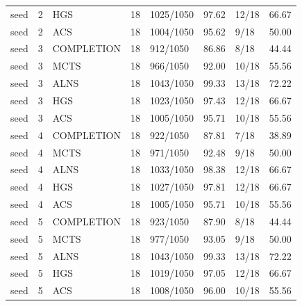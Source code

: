 \begin{tabular}{llllllll}
seed & 2 & HGS & 18 & 1025/1050 & 97.62 & 12/18 & 66.67 \\
seed & 2 & ACS & 18 & 1004/1050 & 95.62 & 9/18 & 50.00 \\
seed & 3 & COMPLETION & 18 & 912/1050 & 86.86 & 8/18 & 44.44 \\
seed & 3 & MCTS & 18 & 966/1050 & 92.00 & 10/18 & 55.56 \\
seed & 3 & ALNS & 18 & 1043/1050 & 99.33 & 13/18 & 72.22 \\
seed & 3 & HGS & 18 & 1023/1050 & 97.43 & 12/18 & 66.67 \\
seed & 3 & ACS & 18 & 1005/1050 & 95.71 & 10/18 & 55.56 \\
seed & 4 & COMPLETION & 18 & 922/1050 & 87.81 & 7/18 & 38.89 \\
seed & 4 & MCTS & 18 & 971/1050 & 92.48 & 9/18 & 50.00 \\
seed & 4 & ALNS & 18 & 1033/1050 & 98.38 & 12/18 & 66.67 \\
seed & 4 & HGS & 18 & 1027/1050 & 97.81 & 12/18 & 66.67 \\
seed & 4 & ACS & 18 & 1005/1050 & 95.71 & 10/18 & 55.56 \\
seed & 5 & COMPLETION & 18 & 923/1050 & 87.90 & 8/18 & 44.44 \\
seed & 5 & MCTS & 18 & 977/1050 & 93.05 & 9/18 & 50.00 \\
seed & 5 & ALNS & 18 & 1043/1050 & 99.33 & 13/18 & 72.22 \\
seed & 5 & HGS & 18 & 1019/1050 & 97.05 & 12/18 & 66.67 \\
seed & 5 & ACS & 18 & 1008/1050 & 96.00 & 10/18 & 55.56 \\
\hline
\end{tabular}
